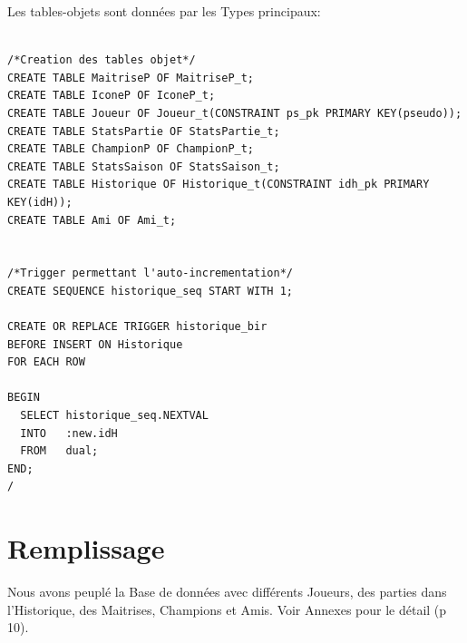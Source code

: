 \documentclass[a4paper,10pt]{report}
\begin{document}
Les tables-objets sont données par les Types principaux:
\begin{lstlisting}

/*Creation des tables objet*/
CREATE TABLE MaitriseP OF MaitriseP_t;
CREATE TABLE IconeP OF IconeP_t;
CREATE TABLE Joueur OF Joueur_t(CONSTRAINT ps_pk PRIMARY KEY(pseudo));
CREATE TABLE StatsPartie OF StatsPartie_t;
CREATE TABLE ChampionP OF ChampionP_t;
CREATE TABLE StatsSaison OF StatsSaison_t;
CREATE TABLE Historique OF Historique_t(CONSTRAINT idh_pk PRIMARY KEY(idH));
CREATE TABLE Ami OF Ami_t;


/*Trigger permettant l'auto-incrementation*/
CREATE SEQUENCE historique_seq START WITH 1;

CREATE OR REPLACE TRIGGER historique_bir
BEFORE INSERT ON Historique
FOR EACH ROW

BEGIN
  SELECT historique_seq.NEXTVAL
  INTO   :new.idH
  FROM   dual;
END;
/

\end{lstlisting}



\section{Remplissage}
Nous avons peuplé la Base de données avec différents Joueurs, des parties dans l'Historique, des Maitrises, Champions et Amis.
Voir Annexes pour le détail (p 10).
\end{document}
